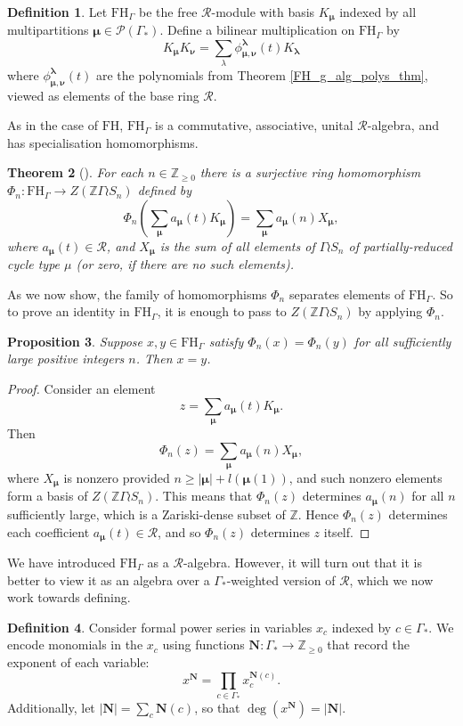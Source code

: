 \documentclass[10pt]{article}
\newtheorem{theorem}{Theorem}[section]
\newtheorem{proposition}[theorem]{Proposition}
\theoremstyle{definition}
\newtheorem{definition}[theorem]{Definition}
\newcommand{\bs}{\boldsymbol}
\newcommand{\FH}{\mathrm{FH}}
\newcommand{\FHG}{\mathrm{FH}_{\Gamma}}
\begin{document}
\begin{definition} 
Let $\FHG$ be the free $\mathcal{R}$-module with basis $K_{\bs \mu}$ indexed by all multipartitions $\bs \mu \in \mathcal{P}(\Gamma_*)$. Define a bilinear multiplication on $\FHG$ by
\[
K_{\bs \mu} K_{\bs \nu} = \sum_{\lambda} \phi_{\bs\mu, \bs\nu}^{\bs\lambda}(t) K_{\bs \lambda}
\]
where $\phi_{\bs\mu, \bs\nu}^{\bs\lambda}(t)$ are the polynomials from Theorem \ref{FH_g_alg_polys_thm}, viewed as elements of the base ring $\mathcal{R}$.
\end{definition}

As in the case of $\FH$, $\FHG$ is a commutative, associative, unital $\mathcal{R}$-algebra, and has specialisation homomorphisms.
\begin{theorem} [{\cite[Section 2.5]{Wang1}}] \label{thm:FH_g_spec_hom}
For each $n \in \mathbb{Z}_{\geq 0}$ there is a surjective ring homomorphism $\Phi_n: \FHG \to Z(\mathbb{Z}\Gamma \wr S_n)$ defined by
\[
\Phi_n \left( \sum_{\bs \mu} a_{\bs \mu}(t) K_{\bs\mu} \right) = \sum_{\bs \mu} a_{\bs \mu}(n) X_{\bs \mu},
\]
where $a_{\bs\mu}(t) \in \mathcal{R}$, and $X_{\bs\mu}$ is the sum of all elements of $\Gamma \wr S_n$ of partially-reduced cycle type $\mu$ \textup{(}or zero, if there are no such elements\textup{)}.
\end{theorem}

As we now show, the family of homomorphisms $\Phi_n$ separates elements of $\FHG$. So to prove an identity in $\FHG$, it is enough to pass to $Z(\mathbb{Z}\Gamma \wr S_n)$ by applying $\Phi_n$.
\begin{proposition} \label{specialisation_distinguishing_prop}
Suppose $x,y \in \FHG$ satisfy $\Phi_n(x) = \Phi_n(y)$ for all sufficiently large positive integers $n$. Then $x=y$.
\end{proposition}
\begin{proof}
Consider an element
\[
z = \sum_{\bs \mu} a_{\bs \mu}(t) K_{\bs\mu}.
\]
Then
\[
\Phi_n \left(z \right) = \sum_{\bs \mu} a_{\bs \mu}(n) X_{\bs \mu},
\]
where $X_{\bs \mu}$ is nonzero provided $n \geq |\bs \mu| + l(\bs \mu(1))$, and such nonzero elements form a basis of $Z(\mathbb{Z}\Gamma \wr S_n)$. This means that $\Phi_n(z)$ determines $a_{\bs \mu}(n)$ for all $n$ sufficiently large, which is a Zariski-dense subset of $\mathbb{Z}$. Hence $\Phi_n(z)$ determines each coefficient $a_{\bs \mu}(t) \in \mathcal{R}$, and so $\Phi_n(z)$ determines $z$ itself. 
\end{proof}

We have introduced $\FHG$ as a $\mathcal{R}$-algebra. However, it will turn out that it is better to view it as an algebra over a $\Gamma_*$-weighted version of $\mathcal{R}$, which we now work towards defining.
\begin{definition}
Consider formal power series in variables $x_c$ indexed by $c \in \Gamma_*$. We encode monomials in the $x_c$ using functions $\mathbf{N}: \Gamma_* \to \mathbb{Z}_{\geq 0}$ that record the exponent of each variable:
\[
x^{\mathbf{N}} = \prod_{c \in \Gamma_*} x_c^{\mathbf{N}(c)}.
\]
Additionally, let $|\mathbf{N}| = \sum_c \mathbf{N}(c)$, so that $\deg(x^{\mathbf{N}}) = |\mathbf{N}|$.
\end{definition}
\end{document}
